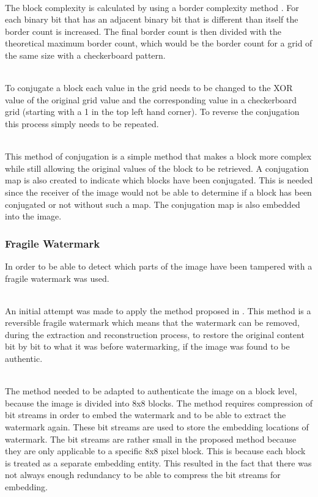 \documentclass[12pt]{article}
\begin{document}
\hspace{0pt} \\
The block complexity is calculated by using a border complexity method \cite{beaullieubpcs}. 
For each binary bit that has an adjacent binary bit that is different than itself the border count is increased. 
The final border count is then divided with the theoretical maximum border count, which would be the border count for a grid of the same size with a checkerboard pattern.

\hspace{0pt} \\
To conjugate a block each value in the grid needs to be changed to the XOR value of the original grid value and the corresponding value in a checkerboard grid (starting with a 1 in the top left hand corner).
To reverse the conjugation this process simply needs to be repeated.

\hspace{0pt} \\
This method of conjugation is a simple method that makes a block more complex while still allowing the original values of the block to be retrieved.
A conjugation map is also created to indicate which blocks have been conjugated.
This is needed since the receiver of the image would not be able to determine if a block has been conjugated or not without such a map.
The conjugation map is also embedded into the image.

\subsubsection{Fragile Watermark}
\label{impFragileWatermark}
In order to be able to detect which parts of the image have been tampered with a fragile watermark was used.

\hspace{0pt} \\
An initial attempt was made to apply the method proposed in \cite{tian2002wavelet}.
This method is a reversible fragile watermark which means that the watermark can be removed, during the extraction and reconstruction process, to restore the original content bit by bit to what it was before watermarking, if the image was found to be authentic.

\hspace{0pt} \\
The method needed to be adapted to authenticate the image on a block level, because the image is divided into 8x8 blocks.
The method requires compression of bit streams in order to embed the watermark and to be able to extract the watermark again.
These bit streams are used to store the embedding locations of watermark.
The bit streams are rather small in the proposed method because they are only applicable to a specific 8x8 pixel block. 
This is because each block is treated as a separate embedding entity.
This resulted in the fact that there was not always enough redundancy to be able to compress the bit streams for embedding.
\end{document}
